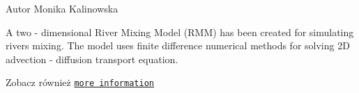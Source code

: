 \begin{DoxyAuthor}{Autor}
Monika Kalinowska
\end{DoxyAuthor}
A two -\/ dimensional River Mixing Model (R\+M\+M) has been created for simulating rivers mixing. The model uses finite difference numerical methods for solving 2\+D advection -\/ diffusion transport equation. \begin{DoxySeeAlso}{Zobacz również}
\href{http://www.igf.edu.pl/~mkalinow/Monika/model.php}{\tt more information} 
\end{DoxySeeAlso}
